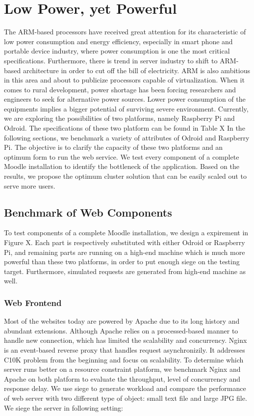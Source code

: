 \chapter{Low Power, yet Powerful}\label{benchmark}
The ARM-based processors have received great attention for its characteristic of low power consumption and energy efficiency, especially in smart phone and portable device industry, where power consumption is one the most critical specifications. Furthermore, there is trend in server industry to shift to ARM-based architecture in order to cut off the bill of electricity. ARM is also ambitious in this area and about to publicize processors capable of virtualization. When it comes to rural development, power shortage has been forcing researchers and engineers to seek for alternative power sources. Lower power consumption of the equipments implies a bigger potential of surviving severe environment.
Currently, we are exploring the possibilities of two platforms, namely Raspberry Pi and Odroid. The specifications of these two platform can be found in Table X
In the following sections, we benchmark a variety of attributes of Odroid and Raspberry Pi. The objective is to clarify the capacity of these two platforms and an optimum form to run the web service. We test every component of a complete Moodle installation to identify the bottleneck of the application. Based on the results, we propose the optimum cluster solution that can be easily scaled out to serve more users.

\section{Benchmark of Web Components}
To test components of a complete Moodle installation, we design a expirement in Figure X. Each part is respectively substituted with either Odroid or Raspberry Pi, and remaining parts are running on a high-end machine which is much more powerful than these two platforms, in order to put enough siege on the testing target. Furthermore, simulated requests are generated from high-end machine as well.

\subsection{Web Frontend}
Most of the websites today are powered by Apache due to its long history and abundant extensions. Although Apache relies on a processed-based manner to handle new connection, which has limited the scalability and concurrency. Nginx is an event-based reverse proxy that handles request asynchronizily. It addresses C10K problem from the beginning and focus on scalability.
To determine which server runs better on a resource constraint platform, we benchmark Nginx and Apache on both platform to evaluate the throughput, level of concurrency and response delay. We use siege to generate workload and compare the performance of web server with two different type of object: small text file and large JPG file.
We siege the server in following setting:

